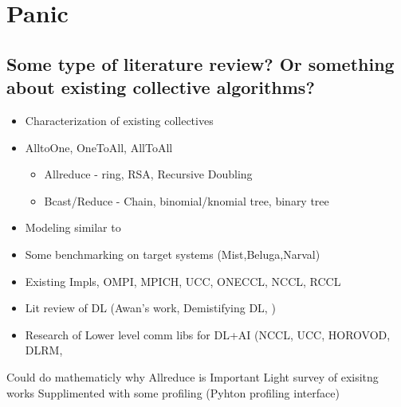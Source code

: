 
\glsresetall %
\chapter[Panic]{Panic}\label{ch:Panic}

\section{Some type of literature review? Or something about existing collective algorithms?}

\begin{itemize}
	\item{Characterization of existing collectives}
	\item{AlltoOne, OneToAll, AllToAll}
    \begin{itemize}
        \item{Allreduce - ring, RSA, Recursive Doubling}
        \item{Bcast/Reduce - Chain, binomial/knomial tree, binary tree}
    \end{itemize}
    \item{Modeling similar to \cite{Thakur2005OptMPICH}}
    \item{Some benchmarking on target systems (Mist,Beluga,Narval)}
    \item{Existing Impls, OMPI, MPICH, UCC, ONECCL, NCCL, RCCL}
\end{itemize}

\begin{itemize}
    \item Lit review of DL (Awan's work, Demistifying DL, )
    \item Research of Lower level comm libs for DL+AI (NCCL, UCC, HOROVOD, DLRM, 
\end{itemize}

Could do mathematicly why Allreduce is Important
Light survey of exisitng works
Supplimented with some profiling (Pyhton profiling interface)


\clearpage